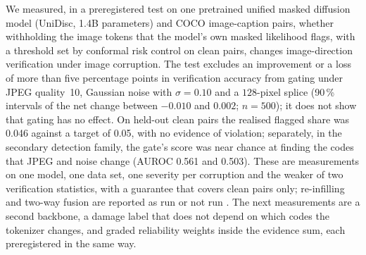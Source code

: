 
We measured, in a preregistered test on one pretrained unified masked diffusion model (UniDisc, 1.4B parameters) and COCO image-caption
pairs, whether withholding the image tokens that the model's own masked likelihood flags, with a threshold set by conformal risk
control on clean pairs, changes image-direction verification under image corruption.
The test excludes an improvement or a loss of more than five percentage points in verification accuracy from gating under JPEG
quality~10, Gaussian noise with $\sigma=0.10$ and a $128$-pixel splice (90\,\% intervals of the net change between $-0.010$ and
$0.002$; $n=500$); it does not show that gating has no effect.
On held-out clean pairs the realised flagged share was 0.046 against a target of 0.05, with no evidence of violation; separately, in
the secondary detection family, the gate's score was near chance at finding the codes that JPEG and noise change (AUROC 0.561 and 0.503).
These are measurements on one model, one data set, one severity per corruption and the weaker of two verification statistics, with a
guarantee that covers clean pairs only; re-infilling and two-way fusion are reported as run or not run .
 The next measurements are a second backbone, a damage label that does not depend on
which codes the tokenizer changes, and graded reliability weights inside the evidence sum, each preregistered in the same way.
